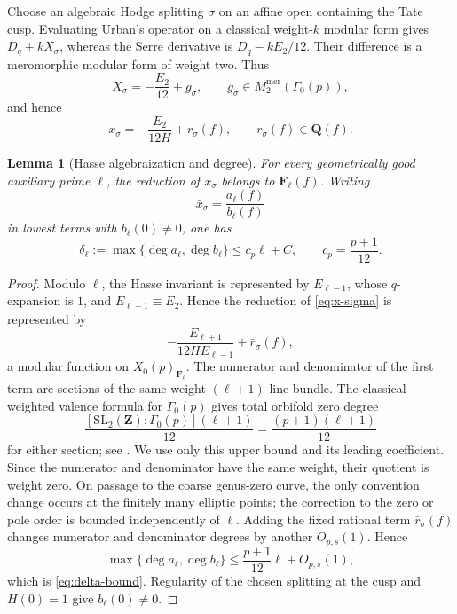 \documentclass[11pt]{article}
\newtheorem{lemma}[lemma]{Lemma}
\theoremstyle{definition}
\theoremstyle{remark}
\newcommand{\Q}{\mathbf Q}
\newcommand{\Z}{\mathbf Z}
\newcommand{\F}{\mathbf F}
\begin{document}
Choose an algebraic Hodge splitting $\sigma$ on an affine open containing the
Tate cusp.  Evaluating Urban's operator on a classical weight-$k$ modular
form gives $D_q+kX_\sigma$, whereas the Serre derivative is
$D_q-kE_2/12$.  Their difference is a meromorphic modular form of weight two.
Thus
\begin{equation}\label{eq:X-sigma}
 X_\sigma=-\frac{E_2}{12}+g_\sigma,
 \qquad g_\sigma\in M_2^{\mathrm{mer}}(\Gamma_0(p)),
\end{equation}
and hence
\begin{equation}\label{eq:x-sigma}
 x_\sigma=-\frac{E_2}{12H}+r_\sigma(f),
 \qquad r_\sigma(f)\in\Q(f).
\end{equation}

\begin{lemma}[Hasse algebraization and degree]\label{lem:Hasse-degree}
For every geometrically good auxiliary prime $\ell$, the reduction of
$x_\sigma$ belongs to $\F_\ell(f)$.  Writing
\[
 \bar x_\sigma=\frac{a_\ell(f)}{b_\ell(f)}
\]
in lowest terms with $b_\ell(0)\ne0$, one has
\begin{equation}\label{eq:delta-bound}
 \delta_\ell:=\max\{\deg a_\ell,\deg b_\ell\}
 \le c_p\ell+C,
 \qquad c_p=\frac{p+1}{12}.
\end{equation}
\end{lemma}

\begin{proof}
Modulo $\ell$, the Hasse invariant is represented by $E_{\ell-1}$, whose
$q$-expansion is $1$, and $E_{\ell+1}\equiv E_2$.  Hence the reduction of
\eqref{eq:x-sigma} is represented by
\[
 -\frac{E_{\ell+1}}{12H E_{\ell-1}}+\bar r_\sigma(f),
\]
a modular function on $X_0(p)_{\F_\ell}$.  The numerator and denominator of
the first term are sections of the same weight-$(\ell+1)$ line bundle.  The
classical weighted valence formula for $\Gamma_0(p)$ gives total orbifold zero
degree
\[
 \frac{[\mathrm{SL}_2(\Z):\Gamma_0(p)](\ell+1)}{12}
 =\frac{(p+1)(\ell+1)}{12}
\]
for either section; see \cite{Katz1973}.  We use only this upper bound and its
leading coefficient.  Since the numerator and denominator have the same
weight, their quotient is weight zero.  On passage to the coarse genus-zero
curve, the only convention change occurs at the finitely many elliptic
points; the correction to the zero or pole order is bounded independently of
$\ell$.  Adding the fixed rational term $\bar r_\sigma(f)$ changes numerator
and denominator degrees by another $O_{p,s}(1)$.  Hence
\[
 \max\{\deg a_\ell,\deg b_\ell\}
 \le\frac{p+1}{12}\ell+O_{p,s}(1),
\]
which is \eqref{eq:delta-bound}.  Regularity of the chosen splitting at the
cusp and $H(0)=1$ give $b_\ell(0)\ne0$.
\end{proof}
\end{document}
